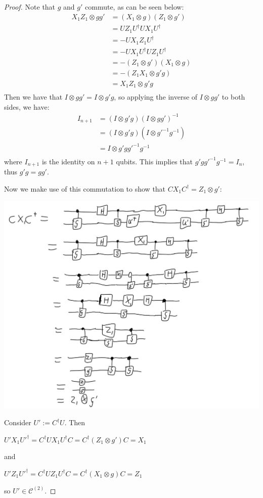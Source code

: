\documentclass[12pt]{dalthesis}
\begin{document}
\begin{proof}
Note that $g$ and $g'$ commute, as can be seen below:
\begin{align}
X_1Z_1 \otimes gg' &= (X_1 \otimes g)(Z_1 \otimes g') \\
 &= UZ_1U^{\dag}UX_1U^{\dag} \\ 
 &= -UX_1Z_1U^\dag \\
 &= -UX_1U^\dag UZ_1U^\dag \\ 
 &= -(Z_1 \otimes g')(X_1 \otimes g) \\
 &= -(Z_1X_1 \otimes g'g) \\
 &= X_1Z_1 \otimes g'g \\
\end{align}
Then we have that $I \otimes gg' = I \otimes g'g$, so applying the inverse of $I \otimes gg'$ to both sides, we have:
\begin{align}
I_{n+1} &= (I \otimes g'g)(I \otimes gg')^{-1} \\
 &= (I \otimes g'g)(I \otimes g'^{-1}g^{-1}) \\ 
 &= I \otimes g'gg'^{-1}g^{-1} \\
\end{align}
where $I_{n+1}$ is the identity on $n+1$ qubits. This implies that $g'gg'^{-1}g^{-1} = I_n$, thus $g'g = gg'$.

Now we make use of this commutation to show that $CX_1C^\dag = Z_1 \otimes g'$:
\begin{center}
\includegraphics[scale = 0.5]{CXC}
\end{center}
Consider $U':= C^\dag U$. Then 
\begin{center}
$U'X_1U'^\dag = C^\dag U X_1 U^\dag C = C^\dag (Z_1 \otimes g') C = X_1$
\end{center} and 
\begin{center}
$U'Z_1U'^\dag = C^\dag U Z_1 U^\dag C = C^\dag (X_1 \otimes g) C = Z_1$
\end{center}
so $U' \in \mathcal{C}^{(2)}$.


\end{proof}
\end{document}
